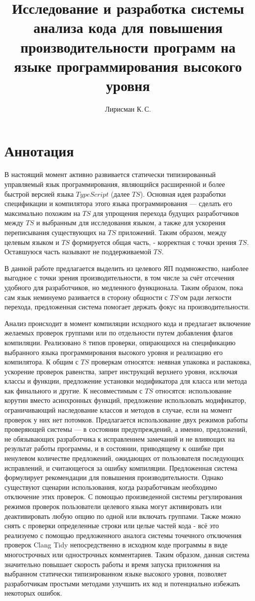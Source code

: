 \documentclass{mipt-thesis-bs}
\title{Исследование и разработка системы анализа кода для повышения производительности программ на языке программирования высокого уровня}
\author{Лирисман К.\,С.}
\begin{document}
\frontmatter
\titlecontents
\chapter{Аннотация}

В настоящий момент активно развивается статически типизированный управляемый язык
программирования, являющийся расширенной и более быстрой версией языка $TypeScript$ (далее $TS$).
Основная идея разработки спецификации и компилятора этого языка программирования — сделать его максимально
похожим на $TS$ для упрощения перехода будущих разработчиков между $TS$ и
выбранным для исследования языком, а также для ускорения переписывания существующих на $TS$ приложений.
Таким образом, между целевым языком и $TS$ формируется общая часть, - корректная с точки зрения $TS$.
Оставшуюся часть называют не поддерживаемой $TS$.

В данной работе предлагается выделить из целевого ЯП подмножество, наиболее выгодное с точки зрения производительности,
в том числе за счёт отсечения удобного для разработчиков, но медленного функционала. Таким образом, пока сам язык неминуемо
разивается в сторону общности с $TS$`ом ради легкости перехода, предложенная система помогает держать фокус
на производительности.

Анализ происходит в момент компиляции исходного кода и предлагает включение желаемых
проверок группами или по отдельности путем добавления флагов компиляции. Реализовано
8 типов проверки, опирающихся на спецификацию выбранного языка
программирования высокого уровня и реализацию его компилятора. К общим с $TS$ проверкам относятся:
неявная упаковка и распаковка, ускорение проверок равенства, запрет инструкций верхнего уровня, исключая
классы и функции, предложение установки модификатора для класса или метода как
финального и другие. К несовместимым с $TS$ относятся: использование корутин вместо асинхронных функций,
предложение использовать модификатор, ограничивающий наследование классов и методов в случае, если на
момент проверок у них нет потомков.
Предлагается использование двух режимов работы проверяющей системы — в состоянии
предупреждений, а именно, предложений, не обязывающих разработчика к исправлением замечаний и не
влияющих на результат работы программы, и в состоянии, приводящему к ошибке при ненулевом количестве
предложений, ожидающих от пользователя последующих исправлений, и считающегося за
ошибку компиляции.
Предложенная система формулирует рекомендации для повышения производительности. Однако
существуют сценарии использования, когда разработчикам необходимо отключение этих проверок.
С помощью произведенной системы регулирования режимов проверок пользователи целевого языка
могут активировать или деактивировать любую опцию по одной или включать группами.
Также можно снять с проверки определенные строки или целые частей кода - всё это реализуемо с помощью
предложенного аналога системы точечного отключения проверок Clang Tidy непосредственно
в исходном коде программы в виде многострочных или однострочных комментариев.
Таким образом, данная система значительно повышает скорость работы и время запуска
приложения на выбранном статически типизированном языке высокого уровня, позволяет разработчикам
простыми методами улучшить их код и потенциально избежать некоторых ошибок.
\end{document}
